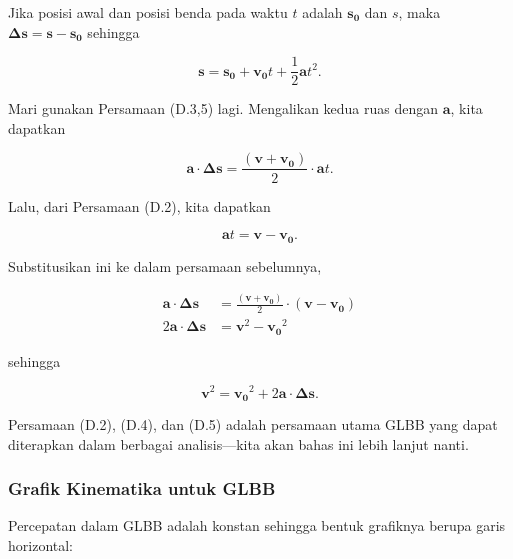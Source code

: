 \documentclass[12pt, a4paper]{article}\usepackage[utf8]{inputenc}
\theoremstyle{plain}
\theoremstyle{plain}
\numberwithin{equation}{section}
\theoremstyle{definition}
\begin{document}
	Jika posisi awal dan posisi benda pada waktu $t$ adalah $\boldsymbol{s_0}$ dan $s$, maka $\boldsymbol{\Delta s} = \boldsymbol{s} - \boldsymbol{s_0}$ sehingga
	
	\begin{equation}
		\boldsymbol{s} = \boldsymbol{s_0} + \boldsymbol{v_0} t + \frac{1}{2} \boldsymbol{a} t^2.
	\end{equation}

	Mari gunakan Persamaan (D.3,5) lagi. Mengalikan kedua ruas dengan $\boldsymbol{a}$, kita dapatkan
	
	\begin{equation*}
		\boldsymbol{a} \cdot \boldsymbol{\Delta s} = \frac{\left( \boldsymbol{v + v_0} \right) }{2} \cdot \boldsymbol{a} t.
	\end{equation*}
	
	Lalu, dari Persamaan (D.2), kita dapatkan
	
	\begin{equation*}
		\boldsymbol{a} t = \boldsymbol{v - v_0}.
	\end{equation*}

	Substitusikan ini ke dalam persamaan sebelumnya,
	
	\begin{align*}
		\boldsymbol{a} \cdot \boldsymbol{\Delta s} &= \frac{ \left( \boldsymbol{v + v_0} \right) }{2} \cdot (\boldsymbol{v - v_0}) \\[.5em]
		2\boldsymbol{a} \cdot \boldsymbol{\Delta s} &= \boldsymbol{v}^2 - \boldsymbol{v_0}^2
	\end{align*}

	sehingga
	
	\begin{equation}
		\boldsymbol{v}^2 = \boldsymbol{v_0}^2 + 2\boldsymbol{a} \cdot \boldsymbol{\Delta s}.
	\end{equation}
	
	Persamaan (D.2), (D.4), dan (D.5) adalah persamaan utama GLBB yang dapat diterapkan dalam berbagai analisis---kita akan bahas ini lebih lanjut nanti.
	
	\subsubsection{Grafik Kinematika untuk GLBB}
	
	Percepatan dalam GLBB adalah konstan sehingga bentuk grafiknya berupa garis horizontal:
	
\end{document}
